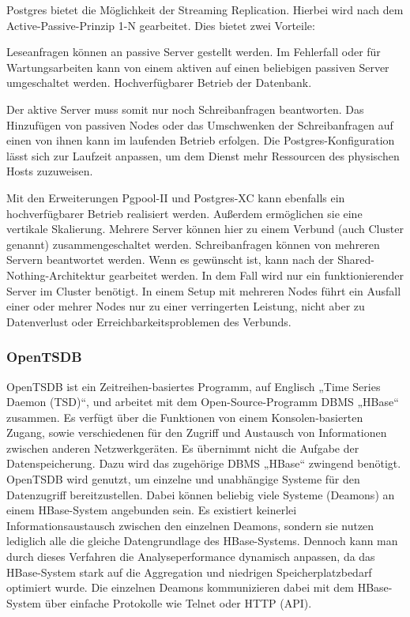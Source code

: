 Postgres bietet die Möglichkeit der \gls{Streaming Replication}. Hierbei wird
nach dem \gls{Active-Passive-Prinzip} 1\hyp{}N gearbeitet. Dies bietet zwei
Vorteile:

\begin{outline}
  \1 Leseanfragen können an passive Server gestellt werden.
  \1 Im Fehlerfall oder für Wartungsarbeiten kann von einem aktiven auf einen
  beliebigen passiven Server umgeschaltet werden.
  \1 Hochverfügbarer Betrieb der Datenbank.
\end{outline}

Der aktive Server muss somit nur noch Schreibanfragen beantworten. Das
Hinzufügen von passiven Nodes oder das Umschwenken der Schreibanfragen auf
einen von ihnen kann im laufenden Betrieb erfolgen. Die
Postgres\hyp{}Konfiguration lässt sich zur Laufzeit anpassen, um dem Dienst mehr
Ressourcen des physischen Hosts zuzuweisen.

Mit den Erweiterungen \gls{Pgpool-II} und \gls{Postgres-XC} kann ebenfalls ein
hochverfügbarer Betrieb realisiert werden. Außerdem ermöglichen sie eine
vertikale \gls{Skalierung}. Mehrere Server können hier zu einem Verbund (auch
Cluster genannt) zusammengeschaltet werden. Schreibanfragen können von mehreren
Servern beantwortet werden. Wenn es gewünscht ist, kann nach der
\gls{Shared-Nothing-Architektur} gearbeitet werden. In dem Fall wird nur ein
funktionierender Server im Cluster benötigt. In einem Setup mit mehreren Nodes
führt ein Ausfall einer oder mehrer Nodes nur zu einer verringerten Leistung,
nicht aber zu Datenverlust oder Erreichbarkeitsproblemen des Verbunds.
\tm%

\subsubsection{OpenTSDB}
\label{subsubsec:opentsdb}
OpenTSDB ist ein Zeitreihen\hyp{}basiertes Programm, auf Englisch „Time Series
Daemon (TSD)“, und arbeitet mit dem Open\hyp{}Source\hyp{}Programm \gls{DBMS}
„HBase“ zusammen. Es verfügt über die Funktionen von einem
Konsolen\hyp{}basierten Zugang, sowie verschiedenen 
für den Zugriff und Austausch von Informationen zwischen anderen
Netzwerkgeräten. Es übernimmt nicht die Aufgabe der Datenspeicherung. Dazu
wird das zugehörige \gls{DBMS} „HBase“ zwingend benötigt. OpenTSDB wird
genutzt, um einzelne und unabhängige Systeme für den Datenzugriff
bereitzustellen. Dabei können beliebig viele Systeme (Deamons) an einem
HBase\hyp{}System angebunden sein. Es existiert keinerlei Informationsaustausch
zwischen den einzelnen Deamons, sondern sie nutzen lediglich alle die gleiche
Datengrundlage des HBase\hyp{}Systems. Dennoch kann man durch dieses Verfahren
die Analyseperformance dynamisch anpassen, da das HBase\hyp{}System stark auf
die Aggregation und niedrigen Speicherplatzbedarf optimiert wurde. Die
einzelnen Deamons kommunizieren dabei mit dem HBase\hyp{}System über einfache
Protokolle wie Telnet oder \gls{HTTP} (\gls{API}).

